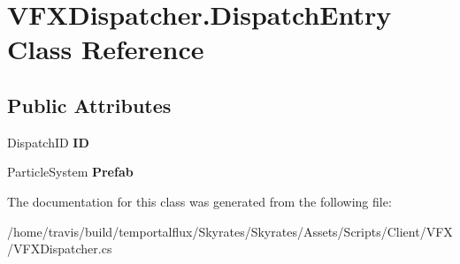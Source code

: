 \hypertarget{class_v_f_x_dispatcher_1_1_dispatch_entry}{\section{V\-F\-X\-Dispatcher.\-Dispatch\-Entry Class Reference}
\label{class_v_f_x_dispatcher_1_1_dispatch_entry}
}
\subsection*{Public Attributes}
\begin{DoxyCompactItemize}
\item 
\hypertarget{class_v_f_x_dispatcher_1_1_dispatch_entry_a950f6be512865da9760352dc957d29e2}{Dispatch\-I\-D {\bfseries I\-D}}\label{class_v_f_x_dispatcher_1_1_dispatch_entry_a950f6be512865da9760352dc957d29e2}

\item 
\hypertarget{class_v_f_x_dispatcher_1_1_dispatch_entry_a626576f3eba03181093e8aecca061e86}{Particle\-System {\bfseries Prefab}}\label{class_v_f_x_dispatcher_1_1_dispatch_entry_a626576f3eba03181093e8aecca061e86}

\end{DoxyCompactItemize}


The documentation for this class was generated from the following file\-:\begin{DoxyCompactItemize}
\item 
/home/travis/build/temportalflux/\-Skyrates/\-Skyrates/\-Assets/\-Scripts/\-Client/\-V\-F\-X/V\-F\-X\-Dispatcher.\-cs\end{DoxyCompactItemize}
